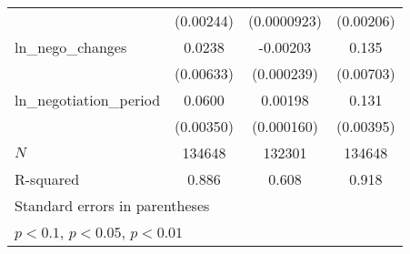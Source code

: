 {\begin{tabular}{l*{3}{c}}
            &   (0.00244)         & (0.0000923)         &   (0.00206)         \\
\addlinespace
ln\_nego\_changes&      0.0238\sym{***}&    -0.00203\sym{***}&       0.135\sym{***}\\
            &   (0.00633)         &  (0.000239)         &   (0.00703)         \\
\addlinespace
ln\_negotiation\_period&      0.0600\sym{***}&     0.00198\sym{***}&       0.131\sym{***}\\
            &   (0.00350)         &  (0.000160)         &   (0.00395)         \\
\midrule
\(N\)       &      134648         &      132301         &      134648         \\
R-squared   &       0.886         &       0.608         &       0.918         \\
\bottomrule
\multicolumn{4}{l}{\footnotesize Standard errors in parentheses}\\
\multicolumn{4}{l}{\footnotesize \sym{*} \(p<0.1\), \sym{**} \(p<0.05\), \sym{***} \(p<0.01\)}\\
\end{tabular}
}
